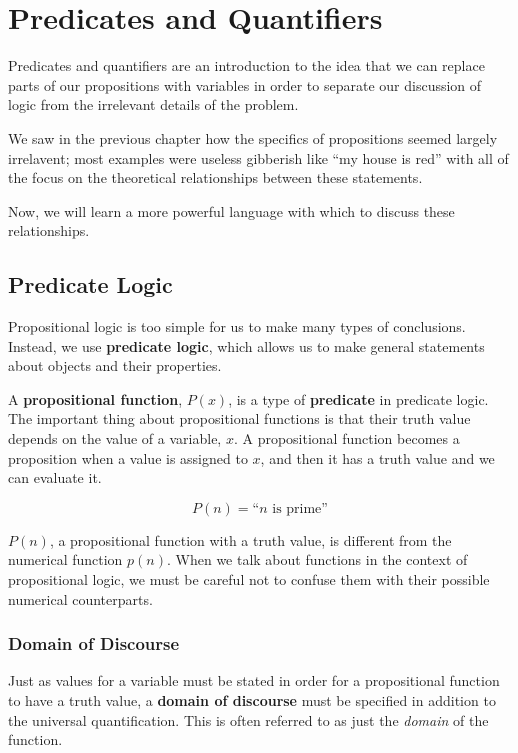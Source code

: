 \chapter{Predicates and Quantifiers}

Predicates and quantifiers are an introduction to the idea that we can replace parts of our propositions with variables in order to separate our discussion of logic from the irrelevant details of the problem.

We saw in the previous chapter how the specifics of propositions seemed largely irrelavent; most examples were useless gibberish like ``my house is red'' with all of the focus on the theoretical relationships between these statements.

Now, we will learn a more powerful language with which to discuss these relationships.

\section{Predicate Logic}

Propositional logic is too simple for us to make many types of conclusions.
Instead, we use \textbf{predicate logic}, which allows us to make general
statements about objects and their properties.

A \textbf{propositional function}, $P(x)$, is a
type of \textbf{predicate} in
predicate logic. The important thing about propositional functions is that their truth value depends on the value of a variable, $x$.
A propositional function becomes a proposition when a value is assigned to $x$, and then it has a truth value and we can evaluate it.
\begin{ex}
  \[ P(n)=\text{``$n$ is prime''} \]
  \begin{remark}
    $P(n)$, a propositional function with a truth value, is different from the numerical function $p(n)$.
    When we talk about functions in the context of propositional logic, we must be careful not to confuse them with their possible numerical counterparts.
  \end{remark}
\end{ex}


\subsection{Domain of Discourse}
Just as values for a variable must be stated in order for a propositional function to have a truth value, a \textbf{domain of discourse} must be specified in addition to the universal quantification.
This is often referred to as just the \emph{domain} of the function.


